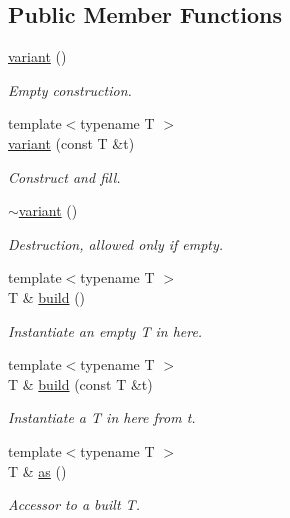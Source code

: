 \subsection*{Public Member Functions}
\begin{DoxyCompactItemize}
\item 
\hyperlink{structyy_1_1variant_ad89e5bb6a0418c8065b9d0d2b05b2d23}{variant} ()
\begin{DoxyCompactList}\small\item\em Empty construction. \end{DoxyCompactList}\item 
{\footnotesize template$<$typename T $>$ }\\\hyperlink{structyy_1_1variant_a8022c28bb598dd69dbb3f14db4c9cc1f}{variant} (const T \&t)
\begin{DoxyCompactList}\small\item\em Construct and fill. \end{DoxyCompactList}\item 
\hyperlink{structyy_1_1variant_a41eed194f0196ede63cd451e9b7835e3}{$\sim$variant} ()
\begin{DoxyCompactList}\small\item\em Destruction, allowed only if empty. \end{DoxyCompactList}\item 
{\footnotesize template$<$typename T $>$ }\\T \& \hyperlink{structyy_1_1variant_a182022d05c0d80a410ba83996ec0b637}{build} ()
\begin{DoxyCompactList}\small\item\em Instantiate an empty {\itshape T} in here. \end{DoxyCompactList}\item 
{\footnotesize template$<$typename T $>$ }\\T \& \hyperlink{structyy_1_1variant_ae638b88f2eb38e93f0cb4b74bda844fe}{build} (const T \&t)
\begin{DoxyCompactList}\small\item\em Instantiate a {\itshape T} in here from {\itshape t}. \end{DoxyCompactList}\item 
{\footnotesize template$<$typename T $>$ }\\T \& \hyperlink{structyy_1_1variant_a7fae4866c8d57a6f2ea30e9926e367cd}{as} ()
\begin{DoxyCompactList}\small\item\em Accessor to a built {\itshape T}. \end{DoxyCompactList}\item 

\end{DoxyCompactItemize}
